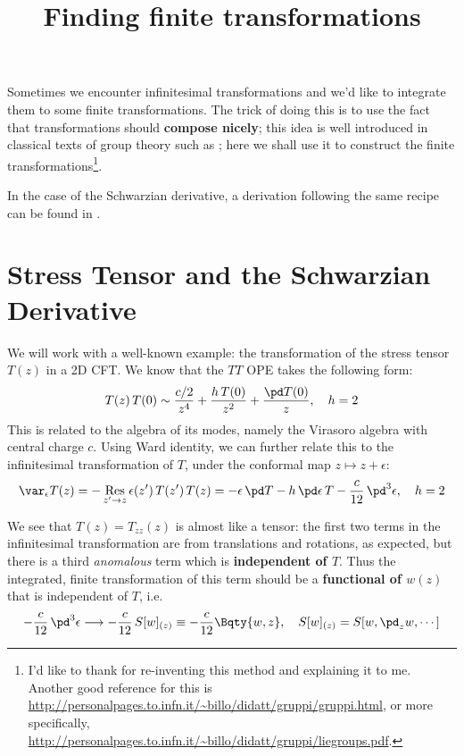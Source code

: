\documentclass[a4paper
	,10pt
]{article}
\title{Finding finite transformations}
\begin{document}
\maketitle
{}
\thispagestyle{empty}

	Sometimes we encounter infinitesimal transformations and we'd like to integrate them to some finite transformations. The trick of doing this is to use the fact that transformations should \textbf{compose nicely}; this idea is well introduced in classical texts of group theory such as \textcite{wybourne1993classical}; here we shall use it to construct the finite transformations\footnote{
		I'd like to thank  for re-inventing this method and explaining it to me. Another good reference for this is \url{http://personalpages.to.infn.it/~billo/didatt/gruppi/gruppi.html}, or more specifically, \url{http://personalpages.to.infn.it/~billo/didatt/gruppi/liegroups.pdf}. 
	}. 
	
	In the case of the Schwarzian derivative, a derivation following the same recipe can be found in \textcite{Blumenhagen:2013fgp}. 

\setlength{\parskip}{.1\baselineskip}
\tableofcontents
\setlength{\parskip}{\parskipnorm}

\section{Stress Tensor and the Schwarzian Derivative}
	We will work with a well-known example: the transformation of the stress tensor $T(z)$ in a 2D CFT. We know that the $TT$ OPE takes the following form:
	\begin{equation}
		T(z)\,T(0)
		\sim \frac{c/2}{z^4}
			+ \frac{h\,T(0)}{z^2}
			+ \frac{\pd T(0)}{z},
	\quad h = 2
	\end{equation}
	This is related to the algebra of its modes, namely the Virasoro algebra with central charge $c$. Using Ward identity, we can further relate this to the infinitesimal transformation of $T$, under the conformal map $z\mapsto z+\epsilon$:
	\begin{equation}
		\var_\epsilon {T(z)}
		= - \operatorname*{Res}_{z'\to z}
				\epsilon(z')\,T(z')\,T(z)
		= - \epsilon\,\pd T
			- h\,\pd\epsilon\,T
			- \frac{c}{12}\,\pd^3 \epsilon,
	\quad h = 2
	\end{equation}
	
	We see that $T(z) = T_{zz}(z)$ is almost like a tensor: the first two terms in the infinitesimal transformation are from translations and rotations, as expected, but there is a third \textit{anomalous} term which is \textbf{independent of $T$}. Thus the integrated, finite transformation of this term should be a \textbf{functional of $w(z)$} that is independent of $T$, i.e.
	\begin{equation}
		- \frac{c}{12}\,\pd^3 \epsilon
	\longrightarrow
		- \frac{c}{12}\, S[w]_{(z)}
		\equiv - \frac{c}{12} \Bqty{w,z},
	\quad
		S[w]_{(z)} = S[w,\pd_z w,\cdots]
	\end{equation}
\pagebreak
\end{document}
